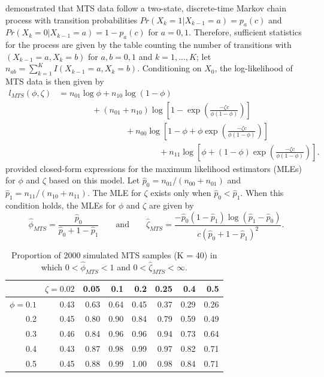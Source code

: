 \documentclass[man, noextraspace, floatsintext]{apa6}\usepackage[]{graphicx}\usepackage[]{color}
\begin{document}
\citet{Brown1977estimation} demonstrated that MTS data follow a two-state, discrete-time Markov chain process with transition probabilities $Pr(X_k = 1 | X_{k-1} = a) = p_a(c)$ and $Pr(X_k = 0 | X_{k-1} = a) = 1 - p_a(c)$ for $a = 0,1$. 
Therefore, sufficient statistics for the process are given by the table counting the number of transitions with $(X_{k-1} = a, X_k = b)$ for $a,b = 0,1$ and $k = 1,...,K$; let $n_{ab} = \sum_{k=1}^K I(X_{k-1} = a, X_k = b)$. 
Conditioning on $X_0$, the log-likelihood of MTS data is then given by \begin{equation}
\begin{aligned}
\label{eq:MTS_loglik}
l_{MTS}(\phi, \zeta) &= n_{01} \log \phi + n_{10} \log\left(1 - \phi\right) \\
& \qquad \qquad + \left(n_{01} + n_{10}\right) \log \left[1 - \exp\left(\frac{-\zeta c}{\phi (1 - \phi)}\right)\right] \\
& \qquad \qquad \qquad \qquad + n_{00} \log\left[1 - \phi + \phi \exp\left(\frac{-\zeta c}{\phi (1 - \phi)}\right)\right]\\
& \qquad \qquad \qquad \qquad \qquad \qquad + n_{11}\log\left[\phi + \left(1 - \phi\right)\exp\left(\frac{-\zeta c}{\phi (1 - \phi)}\right)\right].
\end{aligned}
\end{equation}
\citet{Brown1977estimation} provided closed-form expressions for the maximum likelihood estimators (MLEs) for $\phi$ and $\zeta$ based on this model. Let $\hat{p}_0 = n_{01}/ \left(n_{00} + n_{01}\right)$ and $\hat{p}_1 = n_{11} / \left(n_{10} + n_{11}\right)$. The MLE for $\zeta$ exists only when $\hat{p}_0 < \hat{p}_1$. 
When this condition holds, the MLEs for $\phi$ and $\zeta$ are given by 
\begin{equation}
\label{eq:MTS_mle}
\hat\phi_{MTS} = \frac{\hat{p}_0}{\hat{p}_0 + 1 - \hat{p}_1} \qquad \text{and} \qquad
\hat\zeta_{MTS} = \frac{-\hat{p}_0 \left(1 - \hat{p}_1\right) \log(\hat{p}_1 - \hat{p}_0)}{c \left(\hat{p}_0 + 1 - \hat{p}_1\right)^2}.
\end{equation}



\begin{table}[b]
\centering
\caption{Proportion of 2000 simulated MTS samples (K = 40) in which $0 < \hat\phi_{MTS} < 1$ and $0 < \hat\zeta_{MTS} < \infty$.} 
\label{tab:MTS_zeta_valid}
\begin{tabular}{rrrrrrrr}
  \hline
 & $\zeta = 0.02$ & 0.05 & 0.1 & 0.2 & 0.25 & 0.4 & 0.5 \\ 
  \hline
$\phi = 0.1$ & 0.43 & 0.63 & 0.64 & 0.45 & 0.37 & 0.29 & 0.26 \\ 
  0.2 & 0.45 & 0.80 & 0.90 & 0.84 & 0.79 & 0.59 & 0.49 \\ 
  0.3 & 0.46 & 0.84 & 0.96 & 0.96 & 0.94 & 0.73 & 0.64 \\ 
  0.4 & 0.43 & 0.87 & 0.98 & 0.99 & 0.97 & 0.82 & 0.71 \\ 
  0.5 & 0.45 & 0.88 & 0.99 & 1.00 & 0.98 & 0.84 & 0.71 \\ 
   \hline
\end{tabular}
\end{table}
\end{document}
